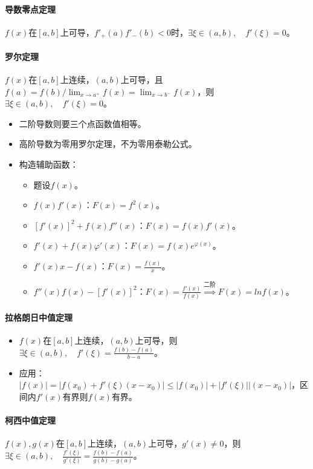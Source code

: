 \documentclass[
12pt, %
a4paper, 
oneside, %
]{scrartcl}
\begin{document}
\paragraph{导数零点定理}
$ f(x) $在$ [a, b] $上可导，$ f'_+(a)f'_-(b) < 0 $时，$ \exists \xi \in (a, b), \quad f'(\xi) = 0 $。
\paragraph{罗尔定理}
$ f(x) $在$ [a, b] $上连续，$ (a, b) $上可导，且$ f(a) = f(b) / \lim_{x \to a^+} f(x) = \lim_{x \to b^-} f(x) $，则$ \exists \xi \in (a, b), \quad f'(\xi) = 0 $。
\begin{itemize}
\item 二阶导数则要三个点函数值相等。
\item 高阶导数为零用罗尔定理，不为零用泰勒公式。
\item 构造辅助函数：
\begin{itemize}
\item 题设$ f(x) $。
\item $ f(x) f'(x) $：$ F(x) = f^2(x) $。
\item $ [f'(x)]^2 + f(x) f''(x) $：$ F(x) = f(x) f'(x) $。
\item $ f'(x) + f(x) \varphi'(x) $：$ F(x) = f(x) e^{\varphi(x)} $。
\item $ f'(x) x - f(x) $：$ F(x) = \frac{f(x)}{x} $。
\item $ f''(x) f(x) - [f'(x)]^2 $：$ F(x) = \frac{f'(x)}{f(x)} $$ \overset{\text{二阶}}{\Longrightarrow} $$ F(x) = ln f(x) $。
\end{itemize}
\end{itemize}
\paragraph{拉格朗日中值定理}
\begin{itemize}
\item $ f(x) $在$ [a, b] $上连续，$ (a, b) $上可导，则$ \exists \xi \in (a, b), \quad f'(\xi) = \frac{f(b) - f(a)}{b - a} $。
\item 应用：$ |f(x)| = |f(x_0) + f'(\xi)(x - x_0)| \leq |f(x_0)| + |f'(\xi)||(x - x_0)| $，区间内$ f'(x) $有界则$ f(x) $有界。
\end{itemize}
\paragraph{柯西中值定理}
$ f(x), g(x) $在$ [a, b] $上连续，$ (a, b) $上可导，$ g'(x) \neq 0 $，则$ \exists \xi \in (a, b), \quad \frac{f'(\xi)}{g'(\xi)} = \frac{f(b) - f(a)}{g(b) - g(a)} $。
\end{document}
